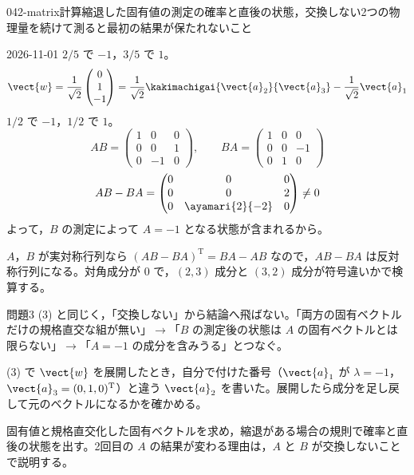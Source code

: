 \documentclass[uplatex,dvipdfmx,a4paper,11pt]{jsarticle}
\begin{document}
\begin{mondai}{042-matrix}{計算}{縮退した固有値の測定の確率と直後の状態，交換しない2つの物理量を続けて測ると最初の結果が保たれないこと}
\begin{kotaeutsushi}{2026-11-01}
$2/5$ で $-1$，$3/5$ で $1$。
\[ \vect{w}=\frac{1}{\sqrt{2}}\begin{pmatrix}0\\1\\-1\end{pmatrix}=\frac{1}{\sqrt{2}}\kakimachigai{\vect{a}_{2}}{\vect{a}_{3}}-\frac{1}{\sqrt{2}}\vect{a}_{1} \]
$1/2$ で $-1$，$1/2$ で $1$。
\[ AB=\begin{pmatrix}1&0&0\\0&0&1\\0&-1&0\end{pmatrix},\qquad BA=\begin{pmatrix}1&0&0\\0&0&-1\\0&1&0\end{pmatrix} \]
\[ AB-BA=\begin{pmatrix}0&0&0\\0&0&2\\0&\ayamari{2}{-2}&0\end{pmatrix}\neq0 \]
よって，$B$ の測定によって $A=-1$ となる状態が含まれるから。
\end{kotaeutsushi}
\begin{kizuki}
\item $A$，$B$ が実対称行列なら $(AB-BA)^{\mathrm{T}}=BA-AB$ なので，$AB-BA$ は反対称行列になる。対角成分が $0$ で，$(2,3)$ 成分と $(3,2)$ 成分が符号違いかで検算する。
\item 問題3 (3) と同じく，「交換しない」から結論へ飛ばない。「両方の固有ベクトルだけの規格直交な組が無い」$\to$「$B$ の測定後の状態は $A$ の固有ベクトルとは限らない」$\to$「$A=-1$ の成分を含みうる」とつなぐ。
\item (3) で $\vect{w}$ を展開したとき，自分で付けた番号（$\vect{a}_{1}$ が $\lambda=-1$，$\vect{a}_{3}=(0,1,0)^{\mathrm{T}}$）と違う $\vect{a}_{2}$ を書いた。展開したら成分を足し戻して元のベクトルになるかを確かめる。
\end{kizuki}
\begin{tadashii}
\houshin 固有値と規格直交化した固有ベクトルを求め，縮退がある場合の規則で確率と直後の状態を出す。2回目の $A$ の結果が変わる理由は，$A$ と $B$ が交換しないことで説明する。
\keisan

\end{tadashii}
\end{mondai}
\end{document}
